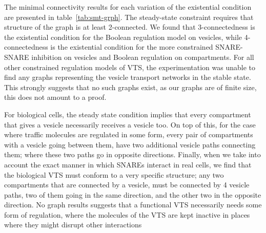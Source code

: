 


The minimal connectivity results for each variation of the existential condition are presented in table~\ref{tab:smt-grph}.
%
The steady-state constraint requires that structure of the graph is at least 2-connected. 
%
We found that 3-connectedness is the existential condition for the Boolean regulation model on vesicles, while 4-connectedness is the existential condition for the more constrained SNARE-SNARE inhibition on vesicles and Boolean regulation on compartments.
%
For all other constrained regulation models of VTS, the experimentation was unable to find any graphs representing the vesicle transport networks in the stable state.
%
This strongly suggests that no such graphs exist, as our graphs are of finite size, this does not amount to a  proof. 

For biological cells, the steady state condition implies that every compartment that gives a vesicle necessarily receives a vesicle too.
%
On top of this, for the case where traffic molecules are regulated in some form, every pair of compartments with a vesicle going between them, have two additional vesicle paths connecting them; where these two paths go in opposite directions.
%
Finally, when we take into account the exact manner in which SNAREs interact in real cells, we find that the biological VTS must conform to a very specific structure; any two compartments that are connected by a vesicle, must be connected by 4 vesicle paths, two of them going in the same direction, and the other two in the opposite direction. 
%
No graph results suggests that a functional VTS necessarily needs some form of regulation, where the molecules of the VTS are kept inactive in places where they might disrupt other interactions

